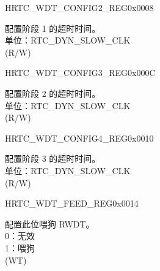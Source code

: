 \begin{register}{H}{RTC\_WDT\_CONFIG2\_REG}{0x0008}\label{regdesc:RTCWDTCONFIG2REG}
%
\regnewline%
\begin{regdesc}\begin{reglist}
\label{fielddesc:RTCWDTSTG1HOLD}\item [RTC\_WDT\_STG1\_HOLD] 配置阶段 1 的超时时间。\\
单位：RTC\_DYN\_SLOW\_CLK  \\ (R/W)
\end{reglist}\end{regdesc}
\end{register}


\begin{register}{H}{RTC\_WDT\_CONFIG3\_REG}{0x000C}\label{regdesc:RTCWDTCONFIG3REG}
%
\regnewline%
\begin{regdesc}\begin{reglist}
\label{fielddesc:RTCWDTSTG2HOLD}\item [RTC\_WDT\_STG2\_HOLD] 配置阶段 2 的超时时间。\\
单位：RTC\_DYN\_SLOW\_CLK  \\ (R/W)
\end{reglist}\end{regdesc}
\end{register}


\begin{register}{H}{RTC\_WDT\_CONFIG4\_REG}{0x0010}\label{regdesc:RTCWDTCONFIG4REG}
%
\regnewline%
\begin{regdesc}\begin{reglist}
\label{fielddesc:RTCWDTSTG3HOLD}\item [RTC\_WDT\_STG3\_HOLD] 配置阶段 3 的超时时间。\\
单位：RTC\_DYN\_SLOW\_CLK  \\ (R/W)
\end{reglist}\end{regdesc}
\end{register}


\begin{register}{H}{RTC\_WDT\_FEED\_REG}{0x0014}\label{regdesc:RTCWDTFEEDREG}
%
%
\regnewline%
\begin{regdesc}\begin{reglist}
\label{fielddesc:RTCWDTRTCWDTFEED}\item [RTC\_WDT\_FEED] 配置此位喂狗 RWDT。\\
0：无效 \\
1：喂狗  \\ (WT)
\end{reglist}\end{regdesc}
\end{register}



